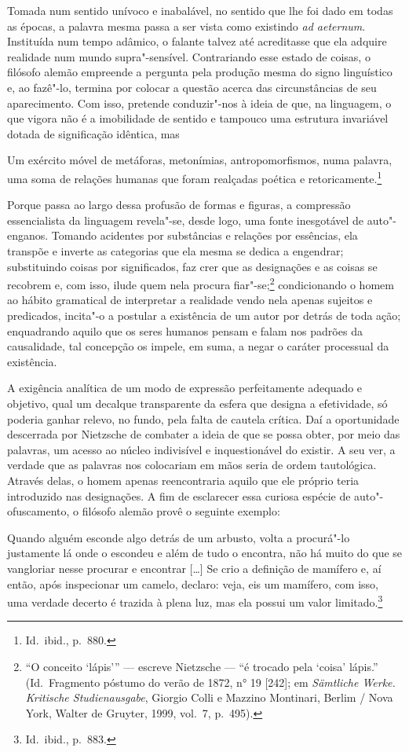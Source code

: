 Tomada num sentido unívoco e inabalável, no sentido que lhe foi dado em
todas as épocas, a palavra mesma passa a ser vista como existindo
\textit{ad aeternum}. Instituída num tempo adâmico, o falante talvez
até acreditasse que ela adquire realidade num mundo
supra"-sensível. Contrariando esse estado de coisas, o filósofo alemão
empreende a pergunta pela produção mesma do signo linguístico e, ao
fazê"-lo, termina por colocar a questão acerca das circunstâncias de
seu aparecimento. Com isso, pretende conduzir"-nos à ideia de que, na
linguagem, o que vigora não é a imobilidade de sentido e tampouco uma
estrutura invariável dotada de significação idêntica, mas 
\begin{hedraquote}
Um exército
móvel de metáforas, metonímias, antropomorfismos, numa palavra, uma
soma de relações humanas que foram realçadas poética e
retoricamente.\footnote{ Id.~ibid., p.~880.}
\end{hedraquote}

Porque passa ao largo dessa profusão de formas e figuras, a compressão
essencialista da linguagem revela"-se, desde logo, uma fonte
inesgotável de auto"-enganos. Tomando acidentes por substâncias e
relações por essências, ela transpõe e inverte as categorias que ela mesma
se dedica a engendrar; substituindo coisas por significados, faz crer
que as designações e as coisas se recobrem e, com isso, ilude quem nela
procura fiar"-se;\footnote{ “O conceito ‘lápis’” --- escreve Nietzsche ---
“é trocado pela ‘coisa’ lápis.” (Id.~Fragmento póstumo do verão de
1872, n° 19 [242]; em \textit{Sämtliche Werke. Kritische
Studienausgabe}, Giorgio Colli e Mazzino Montinari, Berlim / Nova
York, Walter de Gruyter, 1999, vol.~7, p.~495).} condicionando o homem
ao hábito gramatical de interpretar a realidade vendo nela apenas
sujeitos e predicados, incita"-o a postular a existência de um autor
por detrás de toda ação; enquadrando aquilo que os seres humanos pensam
e falam nos padrões da causalidade, tal concepção os impele, em
suma, a negar o caráter processual da existência.

A exigência analítica de um modo de expressão perfeitamente
adequado e objetivo, qual um decalque transparente da esfera que
designa a efetividade, só poderia ganhar relevo, no fundo, pela falta de
cautela crítica. Daí a oportunidade descerrada por Nietzsche de
combater a ideia de que se possa obter, por meio das palavras, um
acesso ao núcleo indivisível e inquestionável do existir. 
A seu ver, a verdade que as
palavras nos colocariam em mãos seria de ordem tautológica. Através
delas, o homem apenas reencontraria aquilo que ele próprio teria
introduzido nas designações. A fim de esclarecer essa curiosa espécie
de auto"-ofuscamento, o filósofo alemão provê o seguinte exemplo:
\begin{hedraquote}
Quando alguém esconde algo detrás de um arbusto, volta a
procurá"-lo justamente lá onde o escondeu e além de tudo o encontra,
não há muito do que se vangloriar nesse procurar e encontrar [\ldots{}] Se
crio a definição de mamífero e, aí então, após inspecionar um camelo,
declaro: veja, eis um mamífero, com isso, uma verdade decerto é trazida
à plena luz, mas ela possui um valor limitado.\footnote{ Id.~ibid., p.~883.}
\end{hedraquote}

